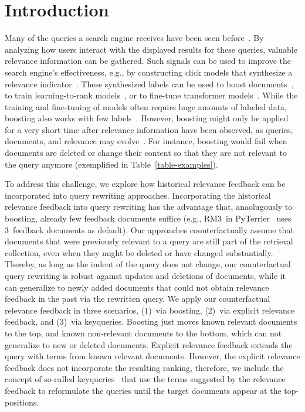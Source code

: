 \section{Introduction}

Many of the queries a search engine receives have been seen before~\cite{DBLP:journals/sigir/SilversteinHMM99}. By analyzing how users interact with the displayed results for these queries, valuable relevance information can be gathered. Such signals can be used to improve the search engine's effectiveness, e.g., by constructing click models that synthesize a relevance indicator~\cite{chuklin:2015}. These synthesized labels can be used to boost documents~\cite{keller:2024b}, to train learning-to-rank models~\cite{liu:2011}, or to fine-tune transformer models~\cite{lin:2021}. While the training and fine-tuning of models often require huge amounts of labeled data, boosting also works with few labels~\cite{keller:2024b}. However, boosting might only be applied for a very short time after relevance information have been observed, as queries, documents, and relevance may evolve~\cite{keller:2024}. For instance, boosting would fail when documents are deleted or change their content so that they are not relevant to the query anymore (exemplified in Table~\ref{table-examples}).




To address this challenge, we explore how historical relevance feedback can be incorporated into query rewriting approaches. Incorporating the historical relevance feedback into query rewriting has the advantage that, anaolugously to boosting, already few feedback documents suffice (e.g., RM3~in PyTerrier~\cite{macdonald:2020} uses 3~feedback documents as default). Our approaches counterfactually assume that documents that were previously relevant to a query are still part of the retrieval collection, even when they might be deleted or have changed substantially. Thereby, as long as the indent of the query does not change, our counterfactual query rewriting is robust against updates and deletions of documents, while it can generalize to newly added documents that could not obtain relevance feedback in the past via the rewritten query. We apply our counterfactual relevance feedback in three scenarios, (1)~via boosting, (2)~via explicit relevance feedback, and (3)~via keyqueries. Boosting just moves known relevant documents to the top, and known non-relevant documents to the bottom, which can not generalize to new or deleted documents. Explicit relevance feedback extends the query with terms from known relevant documents. However, the explicit relevance feedback does not incorporate the resulting ranking, therefore, we include the concept of so-called keyqueries~\cite{gollub:2013a} that use the terms suggested by the relevance feedback to reformulate the queries until the target documents appear at the top-positions.

